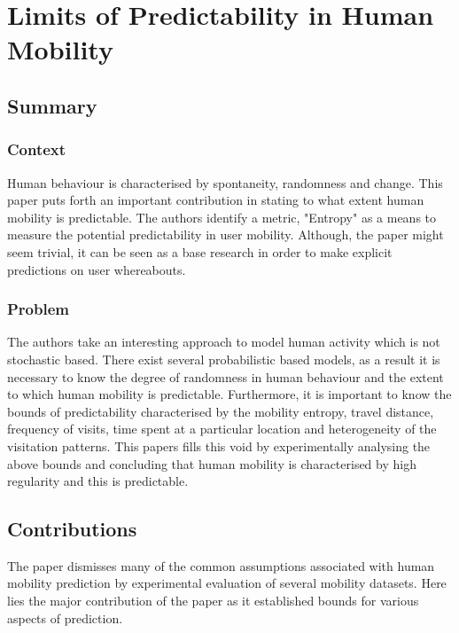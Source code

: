 \newpage
\section{Limits of Predictability in Human Mobility~\cite{Song1018}} \label{lect1}

\subsection*{Summary}

\subsubsection*{Context}

Human behaviour is characterised by spontaneity, randomness and change. This paper puts
forth an important contribution in stating to what extent human mobility is predictable. 
The authors identify a metric, "Entropy" as a means to measure the potential predictability
in user mobility. Although, the paper might seem trivial, it can be seen as a base research
in order to make explicit predictions on user whereabouts. 

\subsubsection*{Problem}

The authors take an interesting approach to model human activity which is not stochastic 
based. There exist several probabilistic based models, as a result it is necessary to 
know the degree of randomness in human behaviour and the extent to which human mobility 
is predictable. Furthermore, it is important to know the bounds of predictability 
characterised by the mobility entropy, travel distance, frequency of visits, time spent 
at a particular location and heterogeneity of the visitation patterns. This papers fills this
void by experimentally analysing the above bounds and concluding that human mobility is 
characterised by high regularity and this is predictable.          

\subsection*{Contributions}

The paper dismisses many of the common assumptions associated with human mobility prediction
by experimental evaluation of several mobility datasets. Here lies the major contribution of 
the paper as it established bounds for various aspects of prediction. 

